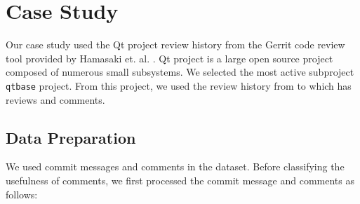 
\section{Case Study}


Our case study used the Qt project review history from the Gerrit code review tool provided by Hamasaki et. al. \cite{Hamasaki2013}. Qt project is a large open source project composed of numerous small subsystems. We selected the most active subproject \texttt{qtbase} project. From this project, we used the review history from  to  which has  reviews and  comments.




%



\subsection{Data Preparation}
We used commit messages and comments in the dataset. Before classifying the usefulness of comments, we first processed the commit message and comments as follows: 

